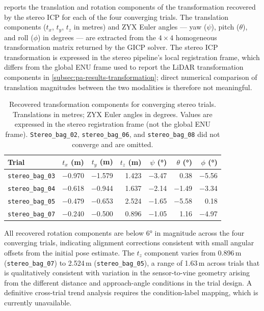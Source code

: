  reports the translation and rotation components of the transformation recovered by the stereo ICP for each of the four converging trials. The translation components ($t_x$, $t_y$, $t_z$ in metres) and ZYX Euler angles --- yaw ($\psi$), pitch ($\theta$), and roll ($\phi$) in degrees --- are extracted from the $4 \times 4$ homogeneous transformation matrix returned by the GICP solver. The stereo ICP transformation is expressed in the stereo pipeline's local registration frame, which differs from the global ENU frame used to report the LiDAR transformation components in \cref{subsec:pa-results-transformation}; direct numerical comparison of translation magnitudes between the two modalities is therefore not meaningful.

\begin{table}[htbp]
  \centering
  \caption{Recovered transformation components for converging stereo trials. Translations in metres; ZYX Euler angles in degrees. Values are expressed in the stereo registration frame (not the global ENU frame). \texttt{Stereo\_bag\_02}, \texttt{stereo\_bag\_06}, and \texttt{stereo\_bag\_08} did not converge and are omitted.}
  \label{tab:pa-results-stereo-transformation}
  \begin{tabularx}{\textwidth}{l r r r r r r}
    \toprule
    \textbf{Trial} &
    \boldmath$t_x$ \textbf{(m)} &
    \boldmath$t_y$ \textbf{(m)} &
    \boldmath$t_z$ \textbf{(m)} &
    \boldmath$\psi$ \textbf{(°)} &
    \boldmath$\theta$ \textbf{(°)} &
    \boldmath$\phi$ \textbf{(°)} \\
    \midrule
    \texttt{stereo\_bag\_03} & $-$0.970 & $-$1.579 & 1.423 & $-$3.47 &    0.38 & $-$5.56 \\
    \texttt{stereo\_bag\_04} & $-$0.618 & $-$0.944 & 1.637 & $-$2.14 & $-$1.49 & $-$3.34 \\
    \texttt{stereo\_bag\_05} & $-$0.479 & $-$0.653 & 2.524 & $-$1.65 & $-$5.58 &    0.18 \\
    \texttt{stereo\_bag\_07} & $-$0.240 & $-$0.500 & 0.896 & $-$1.05 &    1.16 & $-$4.97 \\
    \bottomrule
  \end{tabularx}
\end{table}

All recovered rotation components are below 6° in magnitude across the four converging trials, indicating alignment corrections consistent with small angular offsets from the initial pose estimate. The $t_z$ component varies from 0.896\,m (\texttt{stereo\_bag\_07}) to 2.524\,m (\texttt{stereo\_bag\_05}), a range of 1.63\,m across trials that is qualitatively consistent with variation in the sensor-to-vine geometry arising from the different distance and approach-angle conditions in the trial design. A definitive cross-trial trend analysis requires the condition-label mapping, which is currently unavailable.

